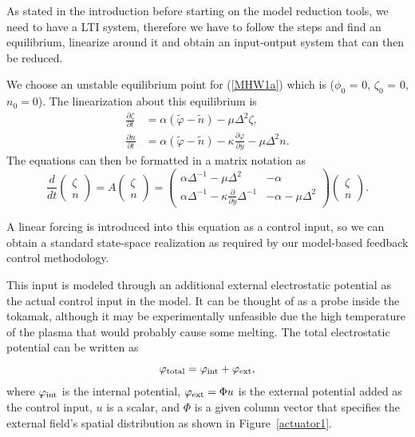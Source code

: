 \documentclass[12pt,lot, lof]{puthesis}
\begin{document}
As stated in the introduction before starting on the model reduction tools, we need to have a LTI system, therefore we have to follow the steps and find an equilibrium, linearize around it and obtain an input-output system that can then be reduced.

We choose  an unstable equilibrium point for (\ref{MHW1a}) which is ($\phi_0$ = 0, $\zeta_0$ = 0, $n_0=0$).
The linearization about this equilibrium is
\begin{subequations}
\begin{align}
\frac{\partial \zeta}{\partial t}  &= \alpha (\tilde{\varphi}-\tilde{n}) - \mu \Delta^2 \zeta,\\
\frac{\partial n}{\partial t}   &= \alpha (\tilde{\varphi}- \tilde{n}) -\kappa \frac{\partial \varphi}{\partial y}- \mu \Delta^2 n.
\end{align}
\end{subequations}
The equations can then be formatted in a matrix notation as
%
\begin{equation}
	\renewcommand\arraystretch{0.8}
	\frac{d}{dt} \begin{pmatrix} \zeta \\ n \end{pmatrix}
	= A \begin{pmatrix} \zeta \\ n \end{pmatrix}
	= \begin{pmatrix}
		\alpha \Delta^{-1} - \mu \Delta^2 & -\alpha \\
		\alpha \Delta^{-1} - \kappa \frac{\partial}{\partial y} \Delta^{-1} & -\alpha - \mu \Delta^2
	\end{pmatrix} \begin{pmatrix} \zeta \\ n \end{pmatrix}.
	\label{mat22}
\end{equation}

A linear forcing is introduced into this equation as a control input, so we can obtain a standard state-space realization as required by our model-based feedback control methodology.

This input is modeled through an additional external electrostatic potential as the actual control input in the model. It can be thought of as a probe inside the tokamak, although it may be experimentally unfeasible due the high temperature of the plasma that would probably cause some melting. The total electrostatic potential can be written as
%
\begin{equation}
	\varphi_{\rm total} = \varphi_{\rm int} + \varphi_{\rm ext},
\end{equation}
%
where $\varphi_{\rm int}$ is the internal potential, $\varphi_{\rm ext} = \Phi u$ is the external potential added as the control input, $u$ is a scalar, and $\Phi$ is a given column vector that specifies the external field's spatial distribution as shown in Figure~\ref{actuator1}. 
\end{document}
